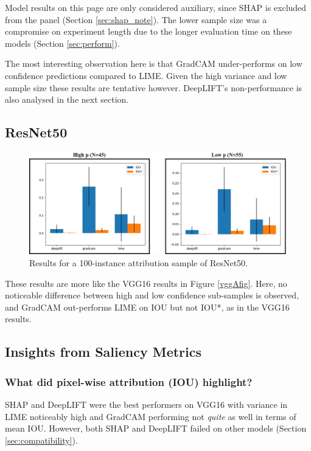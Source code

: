 \documentclass[main]{subfiles}
\begin{document}
Model results on this page are only considered auxiliary, since SHAP is excluded from the panel (Section \ref{sec:shap_note}). The lower sample size was a compromise on experiment length due to the longer evaluation time on these models (Section \ref{sec:perform}).

The most interesting observation here is that GradCAM under-performs on low confidence predictions compared to LIME. Given the high variance and low sample size these results are tentative however. DeepLIFT's non-performance is also analysed in the next section.

\subsection{ResNet50}

\begin{figure}[h]
\centering
\includegraphics[scale=0.35]{resnet.png}
\caption{Results for a 100-instance attribution sample of ResNet50. }
\label{resnetFig}
\end{figure}

These results are more like the VGG16 results in Figure \ref{vggAfig}. Here, no noticeable difference between high and low confidence sub-samples is observed, and GradCAM out-performs LIME on IOU but not IOU*, as in the VGG16 results.


\newpage
\subsection{Insights from Saliency Metrics} \label{sec:saliency_insights}

\subsubsection{What did pixel-wise attribution (IOU) highlight?}
SHAP and DeepLIFT were the best performers on VGG16 with variance in LIME noticeably high and GradCAM performing not \textit{quite} as well in terms of mean IOU. However, both SHAP and DeepLIFT failed on other models (Section \ref{sec:compatibility}).
\end{document}
